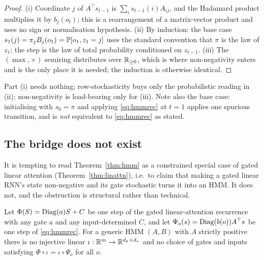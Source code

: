 \begin{proof}
(i) Coordinate $j$ of $A^\top s_{t-1}$ is $\sum_i s_{t-1}(i)A_{ij}$, and the
Hadamard product multiplies it by $b_j(o_t)$; this is a rearrangement of a
matrix-vector product and uses no sign or normalisation hypothesis. (ii) By
induction: the base case $s_1(j) = \pi_j B_j(o_1) = \mathbb{P}[o_1, z_1 = j]$ uses the
standard convention that $\pi$ is the law of $z_1$; the step is the law of total
probability conditioned on $z_{t-1}$. (iii) The $(\max,\times)$ semiring
distributes over $\mathbb{R}_{\ge 0}$, which is where non-negativity enters and is the
only place it is needed; the induction is otherwise identical.
\end{proof}

\begin{remark}
Part (i) needs nothing; row-stochasticity buys only the probabilistic reading in
(ii); non-negativity is load-bearing only for (iii). Note also the base case:
initialising with $s_0 = \pi$ and applying \eqref{eq:hmmrec} at $t=1$ applies one
spurious transition, and is \emph{not} equivalent to \eqref{eq:hmmrec} as stated.
\end{remark}

\subsection{The bridge does not exist}

It is tempting to read Theorem~\ref{thm:hmm} as a constrained special case of
gated linear attention (Theorem~\ref{thm:linattn}), i.e.\ to claim that making a
gated linear RNN's state non-negative and its gate stochastic turns it into an
HMM. It does not, and the obstruction is structural rather than technical.

\begin{theorem}
\label{thm:noembed}
Let $\Phi(S) = \mathrm{Diag}(a)S + C$ be one step of the gated linear-attention
recurrence with any gate $a$ and any input-determined $C$, and let
$\Psi_o(s) = \mathrm{Diag}(b(o))A^{\top}s$ be one step of \eqref{eq:hmmrec}. For a
generic HMM $(A,B)$ with $A$ strictly positive there is no injective linear
$\iota : \mathbb{R}^{m} \to \mathbb{R}^{d_k \times d_v}$ and no choice of gates and inputs
satisfying $\Phi \circ \iota = \iota \circ \Psi_o$ for all $o$.
\end{theorem}

